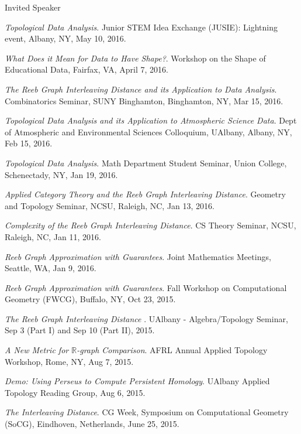 \documentclass{resume} %
\begin{document}
\begin{rSection}{Invited Speaker}
\begin{etaremune}
\item\emph{Topological Data Analysis}. Junior STEM Idea Exchange (JUSIE): Lightning event, Albany, NY, May 10, 2016. 

\item\emph{What Does it Mean for Data to Have Shape?}. Workshop on the Shape of Educational Data, Fairfax, VA, April 7, 2016. 

\item\emph{The Reeb Graph Interleaving Distance and its Application to Data Analysis}. Combinatorics Seminar, SUNY Binghamton, Binghamton, NY, Mar 15, 2016. 

\item\emph{Topological Data Analysis and its Application to Atmospheric Science Data}. Dept of Atmospheric and Environmental Sciences Colloquium, UAlbany, Albany, NY, Feb 15, 2016. 

\item\emph{Topological Data Analysis}. Math Department Student Seminar, Union College, Schenectady, NY, Jan 19, 2016. 

\item\emph{Applied Category Theory and the Reeb Graph Interleaving Distance}. Geometry and Topology Seminar, NCSU, Raleigh, NC, Jan 13, 2016. 

\item\emph{Complexity of the Reeb Graph Interleaving Distance}. CS Theory Seminar, NCSU, Raleigh, NC, Jan 11, 2016. 

\item\emph{Reeb Graph Approximation with Guarantees}. Joint Mathematics Meetings, Seattle, WA, Jan 9, 2016. 

\item\emph{Reeb Graph Approximation with Guarantees}. Fall Workshop on Computational Geometry (FWCG), Buffalo, NY, Oct 23, 2015. 

\item\emph{The Reeb Graph Interleaving Distance }. UAlbany - Algebra/Topology Seminar, Sep 3 (Part I) and Sep 10 (Part II), 2015. 

\item\emph{A New Metric for $\mathbb{R}$-graph Comparison}. AFRL Annual Applied Topology Workshop, Rome, NY, Aug 7, 2015. 

\item\emph{Demo: Using Perseus to Compute Persistent Homology}. UAlbany Applied Topology Reading Group, Aug 6, 2015. 

\item\emph{The Interleaving Distance}. CG Week, Symposium on Computational Geometry (SoCG), Eindhoven, Netherlands, June 25, 2015. 


\end{etaremune}
\end{rSection}
\end{document}
